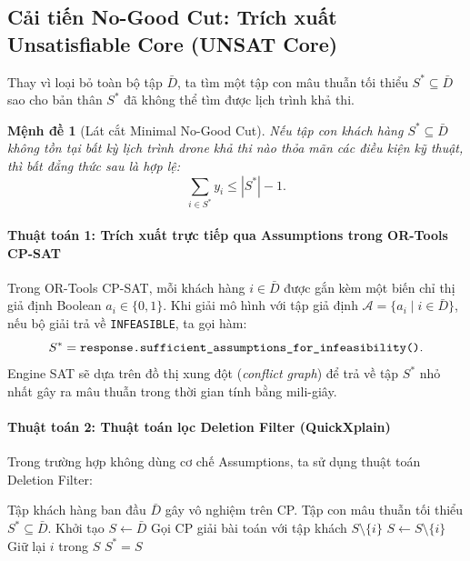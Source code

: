 \documentclass[12pt,a4paper]{article}
\newtheorem{proposition}{Mệnh đề}
\begin{document}
\subsection{Cải tiến No-Good Cut: Trích xuất Unsatisfiable Core (UNSAT Core)}

Thay vì loại bỏ toàn bộ tập $\bar{D}$, ta tìm một tập con mâu thuẫn tối thiểu $S^* \subseteq \bar{D}$ sao cho bản thân $S^*$ đã không thể tìm được lịch trình khả thi.

\begin{proposition}[Lát cắt Minimal No-Good Cut]
Nếu tập con khách hàng $S^* \subseteq \bar{D}$ không tồn tại bất kỳ lịch trình drone khả thi nào thỏa mãn các điều kiện kỹ thuật, thì bất đẳng thức sau là hợp lệ:
\begin{equation}
    \sum_{i \in S^*} y_i \le |S^*| - 1.
    \label{eq:minimal-nogood}
\end{equation}
\end{proposition}

\paragraph{Thuật toán 1: Trích xuất trực tiếp qua Assumptions trong OR-Tools CP-SAT}
Trong OR-Tools CP-SAT, mỗi khách hàng $i \in \bar{D}$ được gắn kèm một biến chỉ thị giả định Boolean $a_i \in \{0, 1\}$. Khi giải mô hình với tập giả định $\mathcal{A} = \{a_i \mid i \in \bar{D}\}$, nếu bộ giải trả về \texttt{INFEASIBLE}, ta gọi hàm:
\[
    S^* = \text{\texttt{response.sufficient\_assumptions\_for\_infeasibility()}}.
\]
Engine SAT sẽ dựa trên đồ thị xung đột (\emph{conflict graph}) để trả về tập $S^*$ nhỏ nhất gây ra mâu thuẫn trong thời gian tính bằng mili-giây.

\paragraph{Thuật toán 2: Thuật toán lọc Deletion Filter (QuickXplain)}
Trong trường hợp không dùng cơ chế Assumptions, ta sử dụng thuật toán Deletion Filter:
\begin{algorithm}[H]
\caption{Thuật toán Deletion Filter tìm 1-Minimal Infeasible Set}
\label{alg:deletion-filter}
\begin{algorithmic}[1]
\Require Tập khách hàng ban đầu $\bar{D}$ gây vô nghiệm trên CP.
\Ensure Tập con mâu thuẫn tối thiểu $S^* \subseteq \bar{D}$.
\State Khởi tạo $S \leftarrow \bar{D}$
    \State Gọi CP giải bài toán với tập khách $S \setminus \{i\}$
        \State $S \leftarrow S \setminus \{i\}$ 
    \Else
        \State Giữ lại $i$ trong $S$ 
    \EndIf
\EndFor
\State \Return $S^* = S$
\end{algorithmic}
\end{algorithm}
\end{document}
